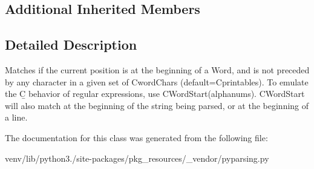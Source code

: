 \subsection*{Additional Inherited Members}


\subsection{Detailed Description}
\begin{DoxyVerb}Matches if the current position is at the beginning of a Word, and
is not preceded by any character in a given set of C{wordChars}
(default=C{printables}). To emulate the C{\b} behavior of regular expressions,
use C{WordStart(alphanums)}. C{WordStart} will also match at the beginning of
the string being parsed, or at the beginning of a line.
\end{DoxyVerb}
 

The documentation for this class was generated from the following file\+:\begin{DoxyCompactItemize}
\item 
venv/lib/python3./site-\/packages/pkg\+\_\+resources/\+\_\+vendor/pyparsing.\+py\end{DoxyCompactItemize}
